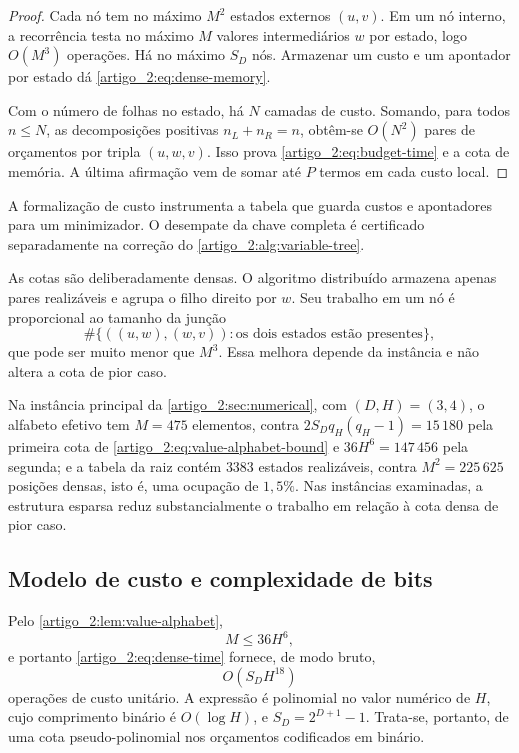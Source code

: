 \begin{proof}
Cada nó tem no máximo $M^2$ estados externos $(u,v)$. Em um nó interno, a
recorrência testa no máximo $M$ valores intermediários $w$ por estado, logo
$O(M^3)$ operações. Há no máximo $S_D$ nós. Armazenar um custo e um apontador
por estado dá \eqref{artigo_2:eq:dense-memory}.

Com o número de folhas no estado, há $N$ camadas de custo. Somando, para todos
$n\le N$, as decomposições positivas $n_L+n_R=n$, obtêm-se $O(N^2)$ pares de
orçamentos por tripla $(u,w,v)$. Isso prova \eqref{artigo_2:eq:budget-time} e a cota de
memória. A última afirmação vem de somar até $P$ termos em cada custo local.
\end{proof}

A formalização de custo instrumenta a tabela que guarda custos e
apontadores para um minimizador. O desempate da chave completa é
certificado separadamente na correção do
\cref{artigo_2:alg:variable-tree}.

\begin{remark}\label{map:artigo_2:9.2}
\label{artigo_2:rem:sparse}
As cotas são deliberadamente densas. O algoritmo distribuído armazena apenas
pares realizáveis e agrupa o filho direito por $w$. Seu trabalho em um nó é
proporcional ao tamanho da junção
\[
 \#\{((u,w),(w,v)):\text{os dois estados estão presentes}\},
\]
que pode ser muito menor que $M^3$. Essa melhora depende da instância e não
altera a cota de pior caso.

Na instância principal da \cref{artigo_2:sec:numerical}, com
$(D,H)=(3,4)$, o alfabeto efetivo tem $M=475$ elementos, contra
$2S_Dq_H(q_H-1)=15\,180$ pela primeira cota de
\eqref{artigo_2:eq:value-alphabet-bound} e $36H^6=147\,456$ pela segunda; e a tabela da
raiz contém $3383$ estados realizáveis, contra $M^2=225\,625$ posições
densas, isto é, uma ocupação de $1{,}5\%$. Nas instâncias examinadas, a
estrutura esparsa reduz substancialmente o trabalho em relação à cota densa de
pior caso.
\end{remark}

\subsection{Modelo de custo e complexidade de bits}

Pelo \cref{artigo_2:lem:value-alphabet},
\[
 M\le36H^6,
\]
e portanto \eqref{artigo_2:eq:dense-time} fornece, de modo bruto,
\begin{equation}
 O(S_DH^{18})
 \label{artigo_2:eq:height-worst}
\end{equation}
operações de custo unitário. A expressão é polinomial no valor numérico de
$H$, cujo comprimento binário é $O(\log H)$, e
$S_D=2^{D+1}-1$. Trata-se, portanto, de uma cota pseudo-polinomial nos
orçamentos codificados em binário.

